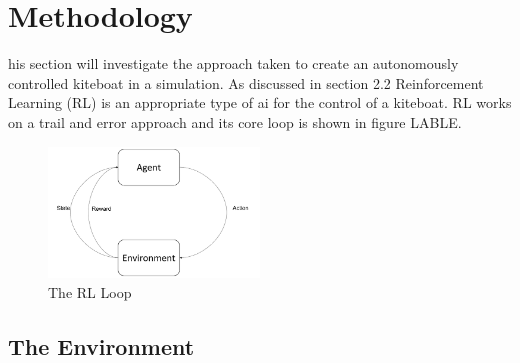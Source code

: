 
%
\let\textcircled=\pgftextcircled
\chapter{Methodology}



his section will investigate the approach taken to create an autonomously controlled kiteboat in a simulation. As discussed in section 2.2 Reinforcement Learning (RL) is an appropriate type of ai for the control of a kiteboat. RL works on a trail and error approach and its core loop is shown in figure LABLE.

\begin{figure}[h]
    \centering
    \includegraphics[width=0.5\textwidth]{Images/RL_Loop.png}
    \caption{The RL Loop}
\label{RL_loop}
\end{figure}


\section{The Environment}

